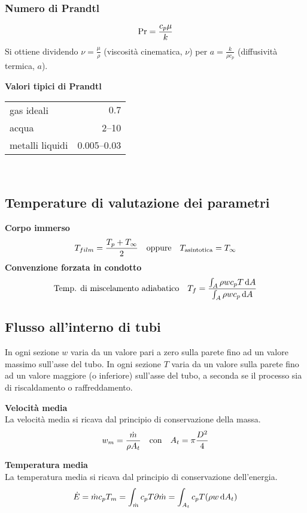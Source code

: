 \subsubsection{Numero di Prandtl}
\[ \operatorname{Pr} = \frac{c_p \mu}{k} \]
Si ottiene dividendo $\nu = \frac{\mu}{\rho}$ (viscosità cinematica, $\nu$) per $a = \frac{k}{\rho c_p}$ (diffusività termica, $a$).

\textbf{Valori tipici di Prandtl}\\
\begin{tabular}{p{3cm}r}
    \toprule
    gas ideali & $0.7$\\
    acqua & \numrange{2}{10}\\
    metalli liquidi & \numrange{0.005}{0.03}\\
    \bottomrule
\end{tabular}\\

\subsection{Temperature di valutazione dei parametri}
\textbf{Corpo immerso}\\
\[ T_{film} = \frac{T_p + T_\infty}{2} \qq{oppure} T_{\text{asintotica}} = T_\infty \]
\textbf{Convenzione forzata in condotto}\\
\[ \qq*{Temp. di miscelamento adiabatico} T_f = \frac{\int_A \rho w c_p T \dd{A}}{\int_A \rho w c_p \dd{A}} \]

\subsection{Flusso all'interno di tubi}
In ogni sezione $w$ varia da un valore pari a zero sulla parete fino ad un valore massimo sull'asse del tubo.
In ogni sezione $T$ varia da un valore sulla parete fino ad un valore maggiore (o inferiore) sull'asse del tubo, a seconda se il processo sia di riscaldamento o raffreddamento.

\textbf{Velocità media}\\
La velocità media si ricava dal principio di conservazione della massa.
\[ w_m = \frac{\dot{m}}{\rho A_t} \qq{con} A_t = \pi \frac{D^2}{4} \]

\textbf{Temperatura media}\\
La temperatura media si ricava dal principio di conservazione dell'energia.
\[ \dot{E} = \dot{m} c_p T_m = \int_{\dot{m}} c_p T \partial \dot{m} = \int_{A_t} c_p T \qty(\rho w \dd{A_t}) \]

